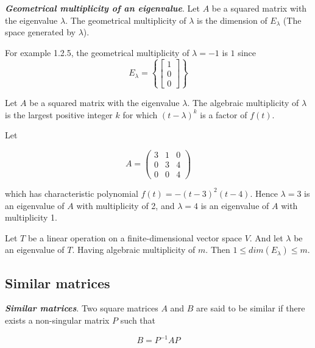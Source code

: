 \documentclass{report}
\begin{document}
    \begin{defBox}
        \textit{\textbf{Geometrical multiplicity of an eigenvalue}}. Let $A$ be a squared matrix with the eigenvalue $\lambda$. The geometrical multiplicity of $\lambda$ is the dimension of $E_\lambda$ (The space generated by $\lambda$).
    \end{defBox}

    For example 1.2.5, the geometrical multiplicity of $\lambda = -1$ is $1$ since
    $$E_\lambda = \left\{ \begin{bmatrix}1\\0\\0\end{bmatrix} \right\}$$

    \begin{defBox}
        Let $A$ be a squared matrix with the eigenvalue $\lambda$. The algebraic multiplicity of $\lambda$ is the largest positive integer $k$ for which $(t-\lambda)^k$ is a factor of $f(t)$.
    \end{defBox}

    \begin{Example}
        Let

        $$A =\begin{pmatrix}
            3 & 1 & 0\\
            0 & 3 & 4\\
            0 & 0 & 4
        \end{pmatrix}$$

        which has characteristic polynomial $f(t) = -(t-3)^2(t-4)$. Hence $\lambda = 3$ is an eigenvalue of $A$ with multiplicity of 2, and $\lambda = 4$ is an eigenvalue of $A$ with multiplicity 1.
    \end{Example}

    \begin{thBox}
        Let $T$ be a linear operation on a finite-dimensional vector space $V$. And let $\lambda$ be an eigenvalue of $T$. Having algebraic multiplicity of $m$. Then $1 \leq dim(E_\lambda) \leq m$.
    \end{thBox}

    \subsection*{Similar matrices}

    \begin{defBox}
        \textit{\textbf{Similar matrices}}. Two square matrices $A$ and $B$ are said to be similar if there exists a non-singular matrix $P$ such that

        $$B = P^{-1}AP$$
    \end{defBox}
\end{document}
